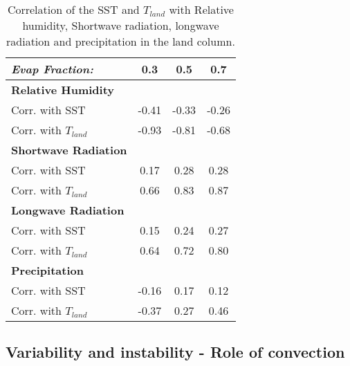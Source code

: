 \begin{center}
	\begin{table}[ht]
		\caption{Correlation of the SST and $T_{land}$ with Relative humidity, 
		Shortwave radiation, longwave radiation and precipitation in the land 
	column.}
		\label{tab:scm_SSTVar}
		\scriptsize
	\begin{tabular}{ l  c  c  c }
		\textit{Evap Fraction:}		& 0.3   & 0.5  & 0.7 \\ \hline
		\textbf{Relative Humidity}\\%
	Corr. with SST						& -0.41  & -0.33 & -0.26\\ %
		Corr. with $T_{land}$			& -0.93  & -0.81 & -0.68\\ 
		\textbf{Shortwave Radiation}\\%
	Corr. with SST						& 0.17  & 0.28 & 0.28\\ %
		Corr. with $T_{land}$			& 0.66  & 0.83 & 0.87\\ 
		\textbf{Longwave Radiation}\\%
	Corr. with SST						& 0.15  & 0.24 & 0.27\\ %
		Corr. with $T_{land}$			& 0.64  & 0.72 & 0.80\\ 
		\textbf{Precipitation}\\%
	Corr. with SST						& -0.16  & 0.17 & 0.12\\ %
		Corr. with $T_{land}$			& -0.37  & 0.27 & 0.46\\ 
	\end{tabular}
	\end{table}
\end{center}

\subsection{Variability and instability - Role of convection}
\label{instability}

